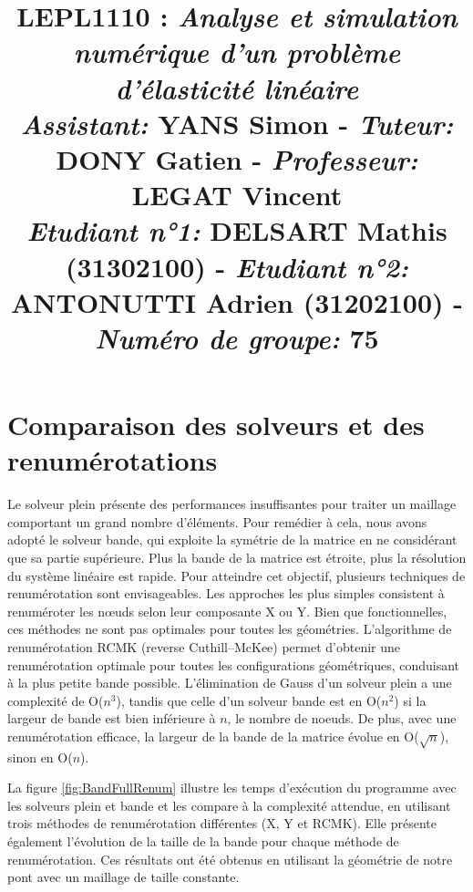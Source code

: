 \documentclass[conference]{IEEEtran}
\begin{document}
\title{\Large{\textbf{LEPL1110 :}} \Large{\textbf{\textit{Analyse et simulation numérique d'un problème d'élasticité linéaire}}}\\
\normalsize{\textit{Assistant:} \textbf{YANS} Simon - \textit{Tuteur:} \textbf{DONY} Gatien - \textit{Professeur:} \textbf{LEGAT} Vincent} \\
\normalsize{\textit{Etudiant n°1:} \textbf{DELSART} Mathis (\textbf{31302100}) - \textit{Etudiant n°2:} \textbf{ANTONUTTI} Adrien (\textbf{31202100}) - \textit{Numéro de groupe:} \textbf{75}}}

\maketitle 

\vspace*{-2cm}

\section{Comparaison des solveurs et des renumérotations}

Le solveur plein présente des performances insuffisantes pour traiter un maillage comportant un grand nombre d'éléments. Pour remédier à cela, nous avons adopté le solveur bande, qui exploite la symétrie de la matrice en ne considérant que sa partie supérieure. Plus la bande de la matrice est étroite, plus la résolution du système linéaire est rapide. Pour atteindre cet objectif, plusieurs techniques de renumérotation sont envisageables. Les approches les plus simples consistent à renuméroter les nœuds selon leur composante X ou Y. Bien que fonctionnelles, ces méthodes ne sont pas optimales pour toutes les géométries. L'algorithme de renumérotation RCMK (reverse Cuthill–McKee) permet d'obtenir une renumérotation optimale pour toutes les configurations géométriques, conduisant à la plus petite bande possible. L'élimination de Gauss d'un solveur plein a une complexité de O($n^3$), tandis que celle d'un solveur bande est en O($n^2$) si la largeur de bande est bien inférieure à $n$, le nombre de noeuds. De plus, avec une renumérotation efficace, la largeur de la bande de la matrice évolue en O($\sqrt{n}$), sinon en O($n$).

La figure \ref{fig:BandFullRenum} illustre les temps d'exécution du programme avec les solveurs plein et bande et les compare à la complexité attendue, en utilisant trois méthodes de renumérotation différentes (X, Y et RCMK). Elle présente également l'évolution de la taille de la bande pour chaque méthode de renumérotation. Ces résultats ont été obtenus en utilisant la géométrie de notre pont avec un maillage de taille constante.
\end{document}
